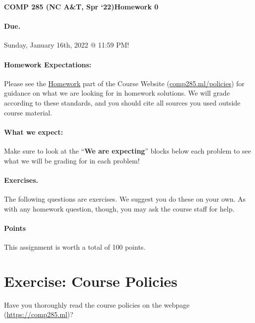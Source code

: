\documentclass [12pt]{article}
\begin{document}
 

{\LARGE \textbf {COMP 285 (NC A\&T, Spr `22)}\hfill \textbf {Homework 0} } 
\vspace {1em} 
\begin {Instruction} 

\paragraph {Due.} Sunday, January 16th, 2022 @ 11:59 PM!
\end {Instruction} 

\vspace {1em} 
\begin {Instruction} \paragraph {Homework Expectations:} Please see the \href{https://www.comp285.ml/homework/#general-homework-information}{Homework} part of the Course Website (\href{https://www.comp285.ml/policies/#collaboration-policy-and-honor-code}{comp285.ml/policies}) for guidance on what we are looking for in homework solutions. We will grade according to these standards, and you should cite all sources you used outside course material.

\paragraph {What we expect:} Make sure to look at the ``\textbf {We are expecting}'' blocks below each problem to see what we will be grading for in each problem! \end {Instruction}

\vspace {1em} 
\begin {Instruction} 

\paragraph {Exercises.} The following questions are exercises. We suggest you do these on your own. As with any homework question, though, you may ask the course staff for help.

\paragraph {Points} This assignment is worth a total of 100 points.
\end {Instruction} 


\section {Exercise: Course Policies} 
 Have you thoroughly read the course policies on the webpage (\href{comp285.ml}{https://comp285.ml})? \\ 
\end{document}
